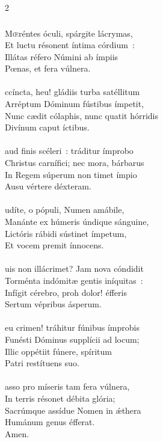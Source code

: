 \documentclass[9pt,twoside]{extarticle}
\begin{document}
\begin{multicols}{2}
{\subsubsection*{\center {}}
\lettrine{M}œréntes óculi, spárgite lácrymas,\\
Et luctu résonent íntima córdium~:\\
Illátas réfero Númini ab ímpiis\\
Pœnas, et fera vúlnera.\\
\\
ccíncta, heu! gládiis turba satéllitum\\
Arréptum Dóminum fústibus ímpetit,\\
Nunc cædit cólaphis, nunc quatit hórridis\\
Divínum caput íctibus.\\
\\
aud finis scéleri~: tráditur ímprobo\\
Christus carnífici; nec mora, bárbarus\\
In Regem súperum non timet ímpio\\
Ausu vértere déxteram.\\
\\
udíte, o pópuli, Numen amábile,\\
Manánte ex húmeris úndique sánguine,\\
Lictóris rábidi sústinet ímpetum,\\
Et vocem premit ínnocens.\\
\\
uis non illácrimet? Jam nova cóndidit\\
Torménta indómitæ gentis iníquitas~:\\
Infígit cérebro, proh dolor! éfferis\\
Sertum vépribus ásperum.\\
\\
eu crimen! tráhitur fúnibus ímprobis\\
Funésti Dóminus supplícii ad locum;\\
Illic oppétiit fúnere, spíritum\\
Patri restítuens suo.\\
\\
asso pro míseris tam fera vúlnera,\\
In terris résonet débita glória;\\
Sacrúmque assídue Nomen in ǽthera\\
Humánum genus éfferat.\\
Amen.

}
\end{multicols}
\end{document}
